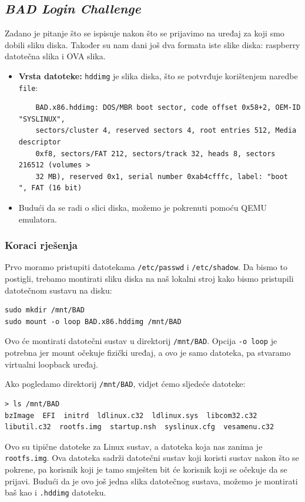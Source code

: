 \documentclass{article}
\begin{document}
\subsection{\textit{BAD Login Challenge}}
\begin{tcolorbox}[
    colback=gray!5,  %
    colframe=gray!75,  %
    title=\textbf{Zadatak}]
    Zadano je pitanje što se ispisuje nakon što se prijavimo na uređaj za koji smo dobili sliku diska. Također su nam dani još dva formata iste slike diska: raspberry datotečna slika i OVA slika.
\end{tcolorbox}

\begin{itemize}
    \item \textbf{Vrsta datoteke:} \texttt{hddimg} je slika diska, što se potvrđuje korištenjem naredbe \texttt{file}:
    \begin{verbatim}
    BAD.x86.hddimg: DOS/MBR boot sector, code offset 0x58+2, OEM-ID "SYSLINUX", 
    sectors/cluster 4, reserved sectors 4, root entries 512, Media descriptor 
    0xf8, sectors/FAT 212, sectors/track 32, heads 8, sectors 216512 (volumes > 
    32 MB), reserved 0x1, serial number 0xab4cfffc, label: "boot    ", FAT (16 bit)
    \end{verbatim}
    \item Budući da se radi o slici diska, možemo je pokrenuti pomoću QEMU emulatora.
\end{itemize}

\subsubsection*{Koraci rješenja}
Prvo moramo pristupiti datotekama \texttt{/etc/passwd} i \texttt{/etc/shadow}. Da bismo to postigli, trebamo montirati sliku diska na naš lokalni stroj kako bismo pristupili datotečnom sustavu na disku:
\begin{verbatim}
sudo mkdir /mnt/BAD
sudo mount -o loop BAD.x86.hddimg /mnt/BAD
\end{verbatim}
Ovo će montirati datotečni sustav u direktorij \texttt{/mnt/BAD}. Opcija \texttt{-o loop} je potrebna jer mount očekuje fizički uređaj, a ovo je samo datoteka, pa stvaramo virtualni loopback uređaj.

Ako pogledamo direktorij \texttt{/mnt/BAD}, vidjet ćemo sljedeće datoteke:
\begin{verbatim}
> ls /mnt/BAD
bzImage  EFI  initrd  ldlinux.c32  ldlinux.sys  libcom32.c32  libutil.c32  rootfs.img  startup.nsh  syslinux.cfg  vesamenu.c32
\end{verbatim}
Ovo su tipične datoteke za Linux sustav, a datoteka koja nas zanima je \texttt{rootfs.img}. Ova datoteka sadrži datotečni sustav koji koristi sustav nakon što se pokrene, pa korisnik koji je tamo smješten bit će korisnik koji se očekuje da se prijavi. Budući da je ovo još jedna slika datotečnog sustava, možemo je montirati baš kao i \texttt{.hddimg} datoteku.
\end{document}
